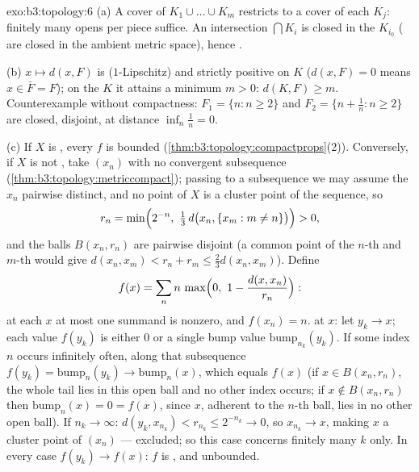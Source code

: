 \begin{solution}{exo:b3:topology:6}
(a) A cover of $K_1 \cup \dots \cup K_m$ restricts to a cover of
each $K_j$: finitely many opens per piece suffice. An
intersection $\bigcap K_i$ is closed in the  $K_{i_0}$
( are closed in the ambient metric space), hence
.

(b) $x \mapsto d(x, F)$ is  ($1$-Lipschitz) and
strictly positive on $K$ ($d(x, F) = 0$ means $x \in \bar F =
F$); on the  $K$ it attains a minimum $m > 0$: $d(K, F)
\geq m$. Counterexample without compactness: $F_1 = \{n : n \geq
2\}$ and $F_2 = \{n + \frac1n : n \geq 2\}$ are closed,
disjoint, at distance $\inf_n \frac1n = 0$.

(c) If $X$ is , every  $f$ is bounded
(\cref{thm:b3:topology:compactprops}(2)). Conversely, if $X$ is
not , take $(x_n)$ with no convergent subsequence
(\cref{thm:b3:topology:metriccompact}); passing to a
subsequence we may assume the $x_n$ pairwise distinct, and no
point of $X$ is a cluster point of the sequence, so
\[
r_n = \min\Bigl(2^{-n},\ \tfrac13\,d\bigl(x_n, \{x_m : m \neq
n\}\bigr)\Bigr) > 0,
\]
and the balls $B(x_n, r_n)$ are pairwise disjoint (a common
point of the $n$-th and $m$-th would give $d(x_n, x_m) < r_n +
r_m \leq \frac23 d(x_n, x_m)$). Define
\[
f(x) = \sum_{n} n\,\max\Bigl(0,\ 1 - \frac{d(x,
x_n)}{r_n}\Bigr):
\]
at each $x$ at most one summand is nonzero, and $f(x_n) = n$.
 at $x$: let $y_k \to x$; each value $f(y_k)$ is
either $0$ or a single bump value $\mathrm{bump}_{n_k}(y_k)$.
If some index $n$ occurs infinitely often, along that
subsequence $f(y_k) = \mathrm{bump}_n(y_k) \to
\mathrm{bump}_n(x)$, which equals $f(x)$ (if $x \in B(x_n,
r_n)$, the whole tail lies in this open ball and no other
index occurs; if $x \notin B(x_n, r_n)$ then
$\mathrm{bump}_n(x) = 0 = f(x)$, since $x$, adherent to the
$n$-th ball, lies in no other open ball). If $n_k \to \infty$:
$d(y_k, x_{n_k}) < r_{n_k} \leq 2^{-n_k} \to 0$, so $x_{n_k}
\to x$, making $x$ a cluster point of $(x_n)$ --- excluded; so
this case concerns finitely many $k$ only. In every case
$f(y_k) \to f(x)$: $f$ is , and unbounded.
\end{solution}

